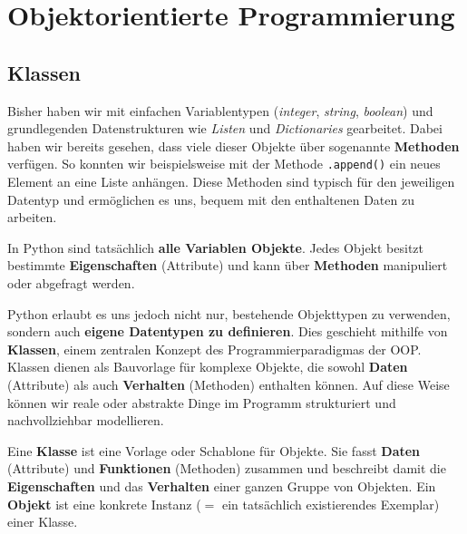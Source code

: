 \chapter{Objektorientierte Programmierung}\label{ch:K07_Klassen}
\section{Klassen}
\label{sec:classes}
Bisher haben wir mit einfachen Variablentypen (\textit{integer}, \textit{string}, \textit{boolean}) und grundlegenden Datenstrukturen wie \textit{Listen} und \textit{Dictionaries} gearbeitet. Dabei haben wir bereits gesehen, dass viele dieser Objekte über sogenannte \textbf{Methoden} verfügen. So konnten wir beispielsweise mit der Methode \lstinline|.append()| ein neues Element an eine Liste anhängen. Diese Methoden sind typisch für den jeweiligen Datentyp und ermöglichen es uns, bequem mit den enthaltenen Daten zu arbeiten.

In Python sind tatsächlich \textbf{alle Variablen Objekte}. Jedes Objekt besitzt bestimmte \textbf{Eigenschaften} (Attribute) und kann über \textbf{Methoden} manipuliert oder abgefragt werden.

Python erlaubt es uns jedoch nicht nur, bestehende Objekttypen zu verwenden, sondern auch \textbf{eigene Datentypen zu definieren}. Dies geschieht mithilfe von \textbf{Klassen}, einem zentralen Konzept des Programmierparadigmas der \gls{OOP}. Klassen dienen als Bauvorlage für komplexe Objekte, die sowohl \textbf{Daten} (Attribute) als auch \textbf{Verhalten} (Methoden) enthalten können. Auf diese Weise können wir reale oder abstrakte Dinge im Programm strukturiert und nachvollziehbar modellieren.


\begin{mydefinition}
Eine \textbf{Klasse} ist eine Vorlage oder Schablone für Objekte. Sie fasst \textbf{Daten} (Attribute) und \textbf{Funktionen} (Methoden) zusammen und beschreibt damit die \textbf{Eigenschaften} und das \textbf{Verhalten} einer ganzen Gruppe von Objekten.  
Ein \textbf{Objekt} ist eine konkrete Instanz ($=$ ein tatsächlich existierendes Exemplar) einer Klasse.
\end{mydefinition}

